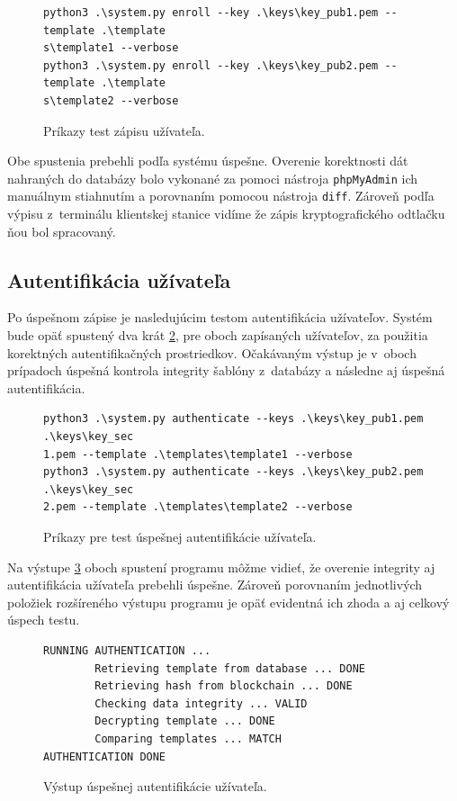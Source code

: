 \begin{figure}[hbt]
\renewcommand\figurename{Výpis kódu}
\begin{Verbatim}[frame=single]
python3 .\system.py enroll --key .\keys\key_pub1.pem --template .\template
s\template1 --verbose
python3 .\system.py enroll --key .\keys\key_pub2.pem --template .\template
s\template2 --verbose
\end{Verbatim}
    \caption{Príkazy test zápisu užívateľa.}
	\label{terminal1}
\end{figure}

Obe spustenia prebehli podľa systému úspešne. Overenie korektnosti dát nahraných do databázy bolo vykonané za pomoci nástroja \texttt{phpMyAdmin} ich manuálnym stiahnutím a porovnaním pomocou nástroja \texttt{diff}. Zároveň podľa výpisu z~terminálu klientskej stanice vidíme že zápis kryptografického odtlačku ňou bol spracovaný.

\subsection{Autentifikácia užívateľa}
Po úspešnom zápise je nasledujúcim testom autentifikácia  užívateľov. Systém bude opäť spustený dva krát \ref{terminal2}, pre oboch zapísaných užívateľov, za použitia korektných autentifikačných prostriedkov. Očakávaným výstup je v~oboch prípadoch úspešná kontrola integrity šablóny z~databázy a následne aj úspešná autentifikácia.

\begin{figure}[hbt]
\renewcommand\figurename{Výpis kódu}
\begin{Verbatim}[frame=single]
python3 .\system.py authenticate --keys .\keys\key_pub1.pem .\keys\key_sec
1.pem --template .\templates\template1 --verbose
python3 .\system.py authenticate --keys .\keys\key_pub2.pem .\keys\key_sec
2.pem --template .\templates\template2 --verbose
\end{Verbatim}
    \caption{Príkazy pre test úspešnej autentifikácie užívateľa.}
	\label{terminal2}
\end{figure}

Na výstupe \ref{terminal3} oboch spustení programu môžme vidieť, že overenie integrity aj autentifikácia užívateľa prebehli úspešne. Zároveň porovnaním jednotlivých položiek rozšíreného výstupu programu je opäť evidentná ich zhoda a aj celkový úspech testu.

\begin{figure}[hbt]
\renewcommand\figurename{Výpis kódu}
\begin{Verbatim}[frame=single]
RUNNING AUTHENTICATION ...
        Retrieving template from database ... DONE
        Retrieving hash from blockchain ... DONE
        Checking data integrity ... VALID
        Decrypting template ... DONE
        Comparing templates ... MATCH
AUTHENTICATION DONE
\end{Verbatim}
    \caption{Výstup úspešnej autentifikácie užívateľa.}
	\label{terminal3}
\end{figure}

